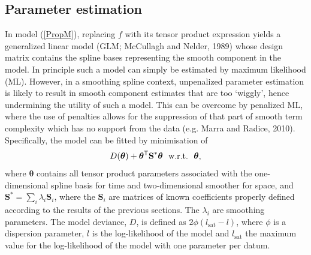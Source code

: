 \documentclass[12pt]{article}
\newcommand{\beq}{\begin{equation}}
\newcommand{\eeq}{\end{equation}}
\newcommand{\ts}{^{\sf T}}
\theoremstyle{definition}
\theoremstyle{plain}
\begin{document}
\subsection{Parameter estimation \label{PE}}

In model (\ref{PropM}), replacing $f$ with its tensor product expression yields a generalized linear model (GLM; McCullagh and Nelder, 1989) whose design matrix contains the spline bases representing the smooth component in the model. In principle such a model can simply be estimated by maximum likelihood (ML). However, in a smoothing spline context, unpenalized parameter estimation is likely to result in smooth component estimates that are too `wiggly', hence undermining the utility of such a model. This can be overcome by penalized ML, where the use of penalties allows for the suppression of that part of smooth term complexity which has no support from the data (e.g. Marra and Radice, 2010). Specifically, the model can be fitted by minimisation of
\beq
D(\bm\theta) + \bm\theta\ts\textbf{S}^*\bm\theta \ \  \text{w.r.t.} \ \  \bm\theta,
\label{Dev}
\eeq
where $\bm\theta$ contains all tensor product parameters associated with the one-dimensional spline basis for time and two-dimensional smoother for space, and $\textbf{S}^*=\sum_i \lambda_i \textbf{S}_i$, where the $\textbf{S}_i$ are matrices of known coefficients properly defined according to the results of the previous sections. The $\lambda_i$ are smoothing parameters. The model deviance, $D$, is defined as $2\phi(l_{\text{sat}}-l)$, where $\phi$ is a dispersion parameter, $l$ is the log-likelihood of the model and $l_{\text{sat}}$ the maximum value for the log-likelihood of the model with one parameter per datum. 
\end{document}
